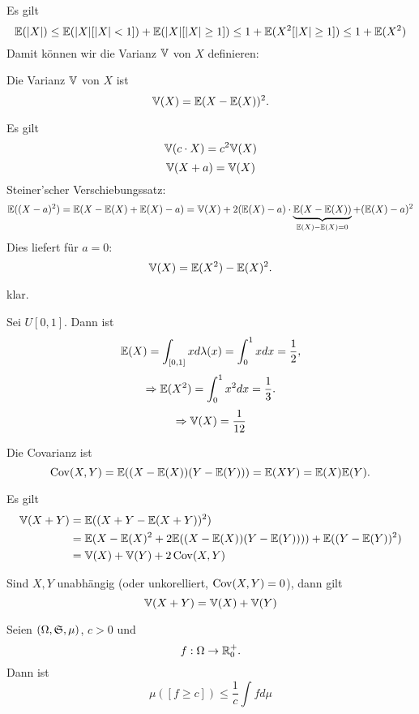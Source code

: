 			\begin{bem}
				Es gilt
				\[ \mathbb{E}(|X|)\le\mathbb{E}(|X|[|X|<1])+\mathbb{E}(|X|[|X|\ge 1]) \le 1+\mathbb{E}(X^2[|X|\ge 1])\le 1+\mathbb{E}(X^2) \]
				Damit können wir die Varianz $\mathbb{V}$ von $X$ definieren:
			\end{bem}
			
			\begin{defi}
				Die Varianz $\mathbb{V}$ von $X$ ist
				\[ \mathbb{V}(X)=\mathbb{E}(X-\mathbb{E}(X))^2.  \]
			\end{defi}
			
			\begin{satz}
				Es gilt
				\[ \mathbb{V}(c\cdot X)=c^2\mathbb{V}(X) \]
				\[ \mathbb{V}(X+a)=\mathbb{V}(X) \]
				Steiner'scher Verschiebungssatz: 
				\[ \mathbb{E}((X-a)^2)=\mathbb{E}(X-\mathbb{E}(X)+\mathbb{E}(X)-a)=\mathbb{V}(X)+2(\mathbb{E}(X)-a)\cdot\underbrace{\mathbb{E}(X-\mathbb{E}(X))}_{\mathbb{E}(X)-\mathbb{E}(X)=0}+(\mathbb{E}(X)-a)^2 \]
				Dies liefert für $a=0$:
				\[ \mathbb{V}(X)=\mathbb{E}(X^2)-\mathbb{E}(X)^2.  \]
			
			\end{satz}
			
			\begin{bew}
				klar. 
			\end{bew}
			
			\begin{bsp}[Gleichverteilung]
				Sei $U[0,1]$. Dann ist
				\[ \mathbb{E}(X)=\int_{[0,1]}xd\lambda(x)=\int_0^1 x dx=\frac{1}{2}, \]
				\[ \Rightarrow \mathbb{E}(X^2)=\int_0^1 x^2 dx=\frac{1}{3}. \]
				\[ \Rightarrow \mathbb{V}(X)=\frac{1}{12} \]	
			\end{bsp}
			
			\begin{defi}[Covarianz]
				Die Covarianz ist
				\[ \operatorname{Cov}(X,Y)=\mathbb{E}((X-\mathbb{E}(X))(Y-\mathbb{E}(Y)))=\mathbb{E}(XY)=\mathbb{E}(X)\mathbb{E}(Y). \]
			\end{defi}
			
			\begin{satz}
				Es gilt
				\begin{align*}
				 \mathbb{V}(X+Y)&=\mathbb{E}((X+Y-\mathbb{E}(X+Y))^2)\\
				 &=\mathbb{E}(X-\mathbb{E}(X)^2+2\mathbb{E}((X-\mathbb{E}(X))(Y-\mathbb{E}(Y))))+\mathbb{E}((Y-\mathbb{E}(Y))^2)\\
				 &=\mathbb{V}(X)+\mathbb{V}(Y)+2\operatorname{Cov}(X,Y)
				\end{align*}
			\end{satz}
			
			\begin{satz}
				Sind $X,Y$ unabhängig (oder unkorelliert,  $\operatorname{Cov}(X,Y)=0$), dann gilt
				\[ \mathbb{V}(X+Y)=\mathbb{V}(X)+\mathbb{V}(Y) \]
			\end{satz}
			
			\begin{satz}
				Seien $(\Omega,\mathfrak{S}, \mu)$, $c>0$ und 
				\[ f: \Omega\to\mathbb{R}^+_0. \]
				Dann ist 
				\[ \mu([f\ge c])\le\frac{1}{c}\int fd\mu \]
			\end{satz}
			
